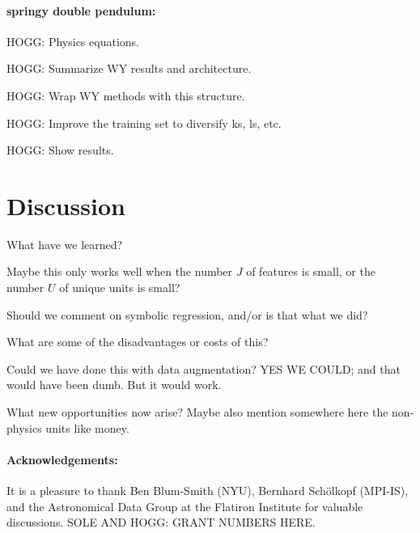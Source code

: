 \documentclass{article}
\begin{document}
\paragraph{springy double pendulum:}
HOGG: Physics equations.

HOGG: Summarize WY results and architecture.

HOGG: Wrap WY methods with this structure.

HOGG: Improve the training set to diversify ks, ls, etc.

HOGG: Show results.

\section{Discussion}\label{sec:discussion}

What have we learned?

Maybe this only works well when the number $J$ of features is small, or the number $U$ of unique units is small?

Should we comment on symbolic regression, and/or is that what we did?

What are some of the disadvantages or costs of this?

Could we have done this with data augmentation? YES WE COULD; and that would have been dumb. But it would work.

What new opportunities now arise? Maybe also mention somewhere here the non-physics units like money.

\paragraph{Acknowledgements:}
It is a pleasure to thank
Ben Blum-Smith (NYU),
Bernhard Sch\"olkopf (MPI-IS),
and the Astronomical Data Group at the Flatiron Institute for valuable discussions.
SOLE AND HOGG: GRANT NUMBERS HERE.
\end{document}
